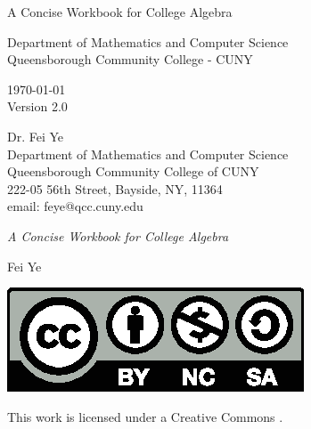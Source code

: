 
\begin{titlepage}
	\thispagestyle{empty}%

	\begin{center}
		\bfseries
		\vspace*{2\baselineskip}
		{\Huge\raggedright \color{main} A Concise Workbook for College Algebra \par}
		\hrulefill\par
		{\LARGE\raggedleft \color{third}{Fei Ye}\par}%
	\end{center}%
	\vspace*{10\baselineskip}
	\vfill
	\color{second}
	\begin{center}
		{
		\large\color{second}
		Department of Mathematics and Computer Science\\[1ex]
		Queensborough Community College - CUNY\\[3ex]
		}

		{\cyan
		\today \\[1ex]
		 Version 2.0
		}
	\end{center}

	\vspace*{1\baselineskip}

	\end{titlepage}


	\frontmatter
	\thispagestyle{empty}
	
	\vspace*{2\baselineskip}
	
	
	\begin{flushleft}
		Dr. Fei Ye\\
		Department of Mathematics and Computer Science\\
		Queensborough Community College of CUNY\\
		222-05 56th Street, Bayside, NY, 11364\\
		email: feye@qcc.cuny.edu
	
		\null\vfill
	
		\textit{A Concise Workbook for College Algebra}
	
		\bigskip
	
		Fei Ye
	
		\bigskip
	
	
	
	
		\includegraphics{pics/by-nc-sa.eps}
	
		This work is licensed under a Creative Commons
		\href{https://creativecommons.org/licenses/by-nc-sa/4.0/}{}.
	
	\end{flushleft}